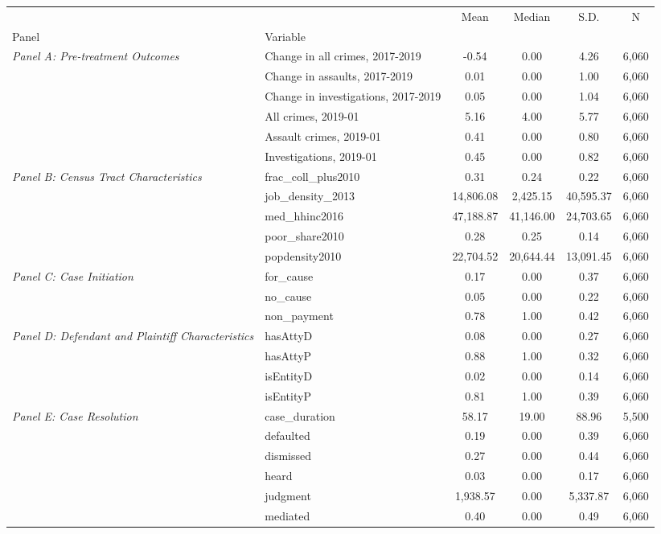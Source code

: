 \begin{tabular}{llcccc}
\toprule
 &  & Mean & Median & S.D. & N \\
Panel & Variable &  &  &  &  \\
\midrule
\multirow[c]{6}{4cm}{\textit{Panel A: Pre-treatment Outcomes}} & Change in all crimes, 2017-2019 & -0.54 & 0.00 & 4.26 & 6,060 \\
 & Change in assaults, 2017-2019 & 0.01 & 0.00 & 1.00 & 6,060 \\
 & Change in investigations, 2017-2019 & 0.05 & 0.00 & 1.04 & 6,060 \\
 & All crimes, 2019-01 & 5.16 & 4.00 & 5.77 & 6,060 \\
 & Assault crimes, 2019-01 & 0.41 & 0.00 & 0.80 & 6,060 \\
 & Investigations, 2019-01 & 0.45 & 0.00 & 0.82 & 6,060 \\
\cline{1-6}
\multirow[c]{5}{4cm}{\textit{Panel B: Census Tract Characteristics}} & frac\_coll\_plus2010 & 0.31 & 0.24 & 0.22 & 6,060 \\
 & job\_density\_2013 & 14,806.08 & 2,425.15 & 40,595.37 & 6,060 \\
 & med\_hhinc2016 & 47,188.87 & 41,146.00 & 24,703.65 & 6,060 \\
 & poor\_share2010 & 0.28 & 0.25 & 0.14 & 6,060 \\
 & popdensity2010 & 22,704.52 & 20,644.44 & 13,091.45 & 6,060 \\
\cline{1-6}
\multirow[c]{3}{4cm}{\textit{Panel C: Case Initiation}} & for\_cause & 0.17 & 0.00 & 0.37 & 6,060 \\
 & no\_cause & 0.05 & 0.00 & 0.22 & 6,060 \\
 & non\_payment & 0.78 & 1.00 & 0.42 & 6,060 \\
\cline{1-6}
\multirow[c]{4}{4cm}{\textit{Panel D: Defendant and Plaintiff Characteristics}} & hasAttyD & 0.08 & 0.00 & 0.27 & 6,060 \\
 & hasAttyP & 0.88 & 1.00 & 0.32 & 6,060 \\
 & isEntityD & 0.02 & 0.00 & 0.14 & 6,060 \\
 & isEntityP & 0.81 & 1.00 & 0.39 & 6,060 \\
\cline{1-6}
\multirow[c]{6}{4cm}{\textit{Panel E: Case Resolution}} & case\_duration & 58.17 & 19.00 & 88.96 & 5,500 \\
 & defaulted & 0.19 & 0.00 & 0.39 & 6,060 \\
 & dismissed & 0.27 & 0.00 & 0.44 & 6,060 \\
 & heard & 0.03 & 0.00 & 0.17 & 6,060 \\
 & judgment & 1,938.57 & 0.00 & 5,337.87 & 6,060 \\
 & mediated & 0.40 & 0.00 & 0.49 & 6,060 \\
\cline{1-6}
\bottomrule
\end{tabular}
